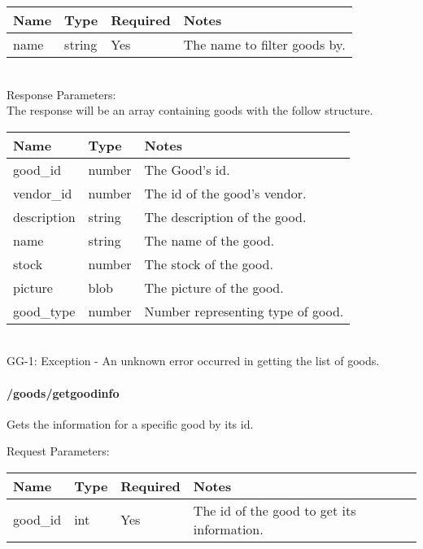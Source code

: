 \documentclass{article}[11pt]
\begin{document}
\noindent
\begin{tabular}{|l|l|l|l|}
\hline
\textbf{Name} & \textbf{Type} & \textbf{Required} & \textbf{Notes} \\
\hline
name & string & Yes & The name to filter goods by. \\
\hline
\end{tabular} \\

\noindent
Response Parameters: \\

\noindent
The response will be an array containing goods with the follow structure.

\noindent
\begin{tabular}{|l|l|l|}
\hline
\textbf{Name} & \textbf{Type} & \textbf{Notes} \\
\hline
good\_id & number & The Good's id. \\
vendor\_id & number & The id of the good's vendor. \\
description & string & The description of the good. \\
name & string & The name of the good. \\
stock & number & The stock of the good. \\
picture & blob & The picture of the good. \\
good\_type & number & Number representing type of good. \\
\hline
\end{tabular} \\

\ErrorsSession
GG-1: Exception - An unknown error occurred in getting the list of goods. \\

\paragraph{/goods/getgoodinfo}\textbf{}

Gets the information for a specific good by its id.

\noindent
Request Parameters:

\noindent
\begin{tabular}{|l|l|l|l|}
\hline
\textbf{Name} & \textbf{Type} & \textbf{Required} & \textbf{Notes} \\
\hline
good\_id & int & Yes & The id of the good to get its information. \\
\hline
\end{tabular} \\
\end{document}
